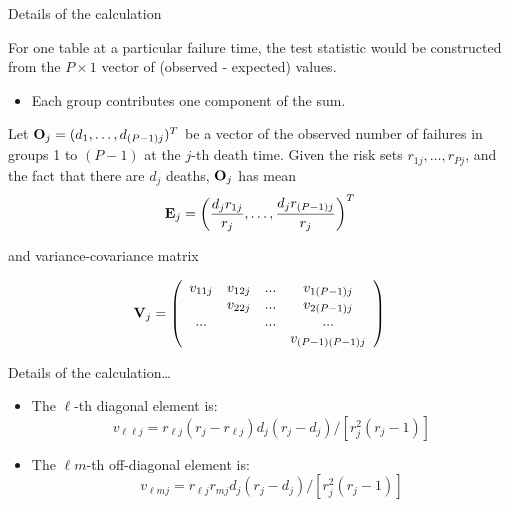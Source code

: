 \documentclass[ignorenonframetext,]{beamer}
\providecommand{\tightlist}{%
  \setlength{\itemsep}{0pt}\setlength{\parskip}{0pt}}
\begin{document}
\begin{frame}{%
\protect\hypertarget{details-of-the-calculation}{%
Details of the calculation}}

\small

For one table at a particular failure time, the test statistic would be
constructed from the \(P \times 1\) vector of (observed - expected)
values.

\begin{itemize}
\tightlist
\item
  Each group contributes one component of the sum.
\end{itemize}

\footnotesize

Let \({\bf O}_j = (d_1, \ldots, d_{(P-1)j})^T\) be a vector of the
observed number of failures in groups 1 to \((P - 1)\) at the \(j\)-th
death time. Given the risk sets \(r_{1j}, \ldots, r_{Pj}\), and the fact
that there are \(d_j\) deaths, \({\bf O}_j\) has mean
\[{\bf E}_j = \left(\frac{d_j r_{1j}}{r_j}, \ldots, \frac{d_j r_{(P-1)j}}{r_j} \right)^T \]

and variance-covariance matrix

\[   {\bf V}_j = \left( \begin{array}{cccc} 
                          v_{11j} & v_{12j} & ... & v_{1(P-1)j} \\
                                  & v_{22j} & ... & v_{2(P-1)j} \\
                              ... &         & ... & ... \\
                                  &         &     & v_{(P-1)(P-1)j} \\
                    \end{array} \right)  \]

\end{frame}

\begin{frame}{%
\protect\hypertarget{details-of-the-calculation-1}{%
Details of the calculation\ldots}}

\begin{itemize}
\item
  The \(\ell\)-th diagonal element is:
  \[     v_{\ell\ell j} = r_{\ell j}(r_j-r_{\ell j}) 
  d_j(r_j-d_j)/[r_j^2(r_j-1)]  \]
\item
  The \(\ell m\)-th off-diagonal element is:
  \[     v_{\ell m j} = r_{\ell j}r_{mj}d_j(r_j-d_j)/[r_j^2(r_j-1)]  \]
\end{itemize}

\end{frame}
\end{document}
